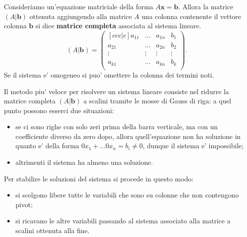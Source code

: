 \begin{definition}
    Consideriamo un'equazione matriciale della forma $A\bm{x} = \bm b$. Allora la matrice $(A|\bm b)$ ottenuta aggiungendo alla matrice $A$ una colonna contenente il vettore colonna $\bm b$ si dice \textbf{matrice completa} associata al sistema lineare.
    \begin{equation}
        (A|\bm b) = \begin{pmatrix}[ccc|c]
            a_{11} & \dots & a_{1n} & b_1\\
            a_{21} & \dots & a_{2n} & b_2\\
            \vdots & \vdots& \vdots & \vdots\\
            a_{k1} & \dots & a_{kn} & b_k\\
        \end{pmatrix}.
    \end{equation}
    Se il sistema e' omogeneo si puo' omettere la colonna dei termini noti.
\end{definition}


Il metodo piu' veloce per risolvere un sistema lineare consiste nel ridurre la matrice completa $(A|\bm b)$ a scalini tramite le mosse di Gauss di riga: a quel punto possono esserci due situazioni:
\begin{itemize}
    \item se ci sono righe con solo zeri prima della barra verticale, ma con un coefficiente diverso da zero dopo, allora quell'equazione non ha soluzione in quanto e' della forma $0x_1 + \dots 0x_n = b_i \neq 0$, dunque il sistema e' impossibile;
    \item altrimenti il sistema ha almeno una soluzione.
\end{itemize}
Per stabilire le soluzioni del sistema si procede in questo modo:
\begin{itemize}
    \item si scelgono libere tutte le variabili che sono su colonne che non contengono pivot;
    \item si ricavano le altre variabili passando al sistema associato alla matrice a scalini ottenuta alla fine.
\end{itemize}

